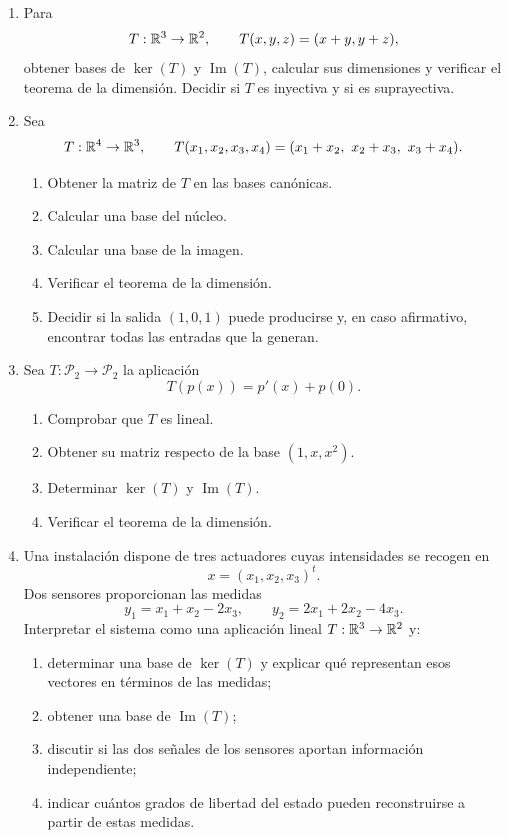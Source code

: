\begin{enumerate}[label=\textbf{\arabic*.},leftmargin=*]
\item Para
\[
T:\mathbb{R}^3\to\mathbb{R}^2,
\qquad
T(x,y,z)=(x+y,y+z),
\]
obtener bases de $\ker(T)$ y $\operatorname{Im}(T)$, calcular sus dimensiones y verificar el teorema de la dimensión. Decidir si $T$ es inyectiva y si es suprayectiva.

\item Sea
\[
T:\mathbb{R}^4\to\mathbb{R}^3,
\qquad
T(x_1,x_2,x_3,x_4)
=(x_1+x_2,\ x_2+x_3,\ x_3+x_4).
\]
\begin{enumerate}[label=\alph*)]
\item Obtener la matriz de $T$ en las bases canónicas.
\item Calcular una base del núcleo.
\item Calcular una base de la imagen.
\item Verificar el teorema de la dimensión.
\item Decidir si la salida $(1,0,1)$ puede producirse y, en caso afirmativo, encontrar todas las entradas que la generan.
\end{enumerate}

\item Sea $T:\mathcal P_2\to\mathcal P_2$ la aplicación
\[
T(p(x))=p'(x)+p(0).
\]
\begin{enumerate}[label=\alph*)]
\item Comprobar que $T$ es lineal.
\item Obtener su matriz respecto de la base $(1,x,x^2)$.
\item Determinar $\ker(T)$ y $\operatorname{Im}(T)$.
\item Verificar el teorema de la dimensión.
\end{enumerate}

\item Una instalación dispone de tres actuadores cuyas intensidades se recogen en
\[
x=(x_1,x_2,x_3)^t.
\]
Dos sensores proporcionan las medidas
\[
y_1=x_1+x_2-2x_3,
\qquad
y_2=2x_1+2x_2-4x_3.
\]
Interpretar el sistema como una aplicación lineal $T:\mathbb{R}^3\to\mathbb{R}^2$ y:
\begin{enumerate}[label=\alph*)]
\item determinar una base de $\ker(T)$ y explicar qué representan esos vectores en términos de las medidas;
\item obtener una base de $\operatorname{Im}(T)$;
\item discutir si las dos señales de los sensores aportan información independiente;
\item indicar cuántos grados de libertad del estado pueden reconstruirse a partir de estas medidas.
\end{enumerate}


\end{enumerate}
